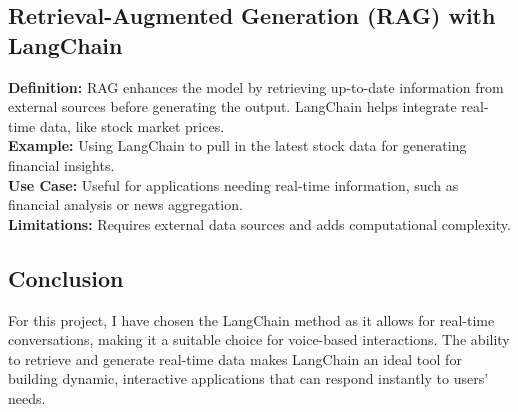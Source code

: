\subsection{Retrieval-Augmented Generation (RAG) with LangChain}
\textbf{Definition:} RAG enhances the model by retrieving up-to-date information from external sources before generating the output. LangChain helps integrate real-time data, like stock market prices. \\
\textbf{Example:} Using LangChain to pull in the latest stock data for generating financial insights. \\
\textbf{Use Case:} Useful for applications needing real-time information, such as financial analysis or news aggregation. \\
\textbf{Limitations:} Requires external data sources and adds computational complexity. \cite{lewis2020retrieval}

\subsection{Conclusion}
For this project, I have chosen the LangChain method as it allows for real-time conversations, making it a suitable choice for voice-based interactions. The ability to retrieve and generate real-time data makes LangChain an ideal tool for building dynamic, interactive applications that can respond instantly to users' needs.

  
 


